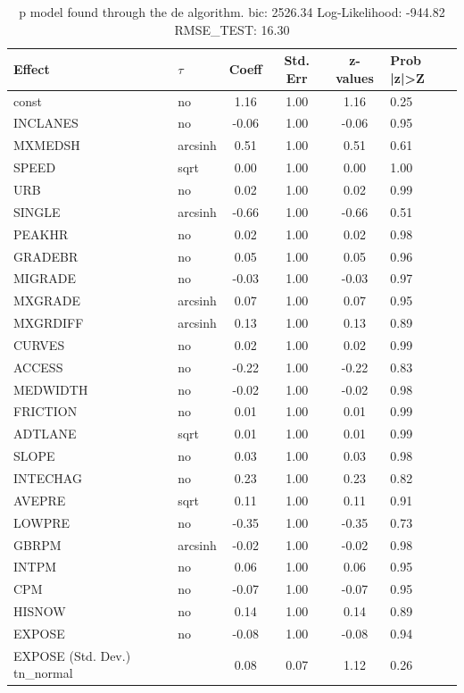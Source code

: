 \begin{table}
	\caption{p model found through the de algorithm. bic: 2526.34 Log-Likelihood: -944.82 RMSE_TEST: 16.30}
	\begin{center}
		\begin{tabular}{|l|l|c|c|c|l|}
			\hline
			Effect & $\tau$ & Coeff & Std. Err & z-values & Prob |z|>Z \\
			\hline
			const & no & 1.16 & 1.00 & 1.16 & 0.25 \\
			\hline
			INCLANES & no & -0.06 & 1.00 & -0.06 & 0.95 \\
			\hline
			MXMEDSH & arcsinh & 0.51 & 1.00 & 0.51 & 0.61 \\
			\hline
			SPEED & sqrt & 0.00 & 1.00 & 0.00 & 1.00 \\
			\hline
			URB & no & 0.02 & 1.00 & 0.02 & 0.99 \\
			\hline
			SINGLE & arcsinh & -0.66 & 1.00 & -0.66 & 0.51 \\
			\hline
			PEAKHR & no & 0.02 & 1.00 & 0.02 & 0.98 \\
			\hline
			GRADEBR & no & 0.05 & 1.00 & 0.05 & 0.96 \\
			\hline
			MIGRADE & no & -0.03 & 1.00 & -0.03 & 0.97 \\
			\hline
			MXGRADE & arcsinh & 0.07 & 1.00 & 0.07 & 0.95 \\
			\hline
			MXGRDIFF & arcsinh & 0.13 & 1.00 & 0.13 & 0.89 \\
			\hline
			CURVES & no & 0.02 & 1.00 & 0.02 & 0.99 \\
			\hline
			ACCESS & no & -0.22 & 1.00 & -0.22 & 0.83 \\
			\hline
			MEDWIDTH & no & -0.02 & 1.00 & -0.02 & 0.98 \\
			\hline
			FRICTION & no & 0.01 & 1.00 & 0.01 & 0.99 \\
			\hline
			ADTLANE & sqrt & 0.01 & 1.00 & 0.01 & 0.99 \\
			\hline
			SLOPE & no & 0.03 & 1.00 & 0.03 & 0.98 \\
			\hline
			INTECHAG & no & 0.23 & 1.00 & 0.23 & 0.82 \\
			\hline
			AVEPRE & sqrt & 0.11 & 1.00 & 0.11 & 0.91 \\
			\hline
			LOWPRE & no & -0.35 & 1.00 & -0.35 & 0.73 \\
			\hline
			GBRPM & arcsinh & -0.02 & 1.00 & -0.02 & 0.98 \\
			\hline
			INTPM & no & 0.06 & 1.00 & 0.06 & 0.95 \\
			\hline
			CPM & no & -0.07 & 1.00 & -0.07 & 0.95 \\
			\hline
			HISNOW & no & 0.14 & 1.00 & 0.14 & 0.89 \\
			\hline
			EXPOSE & no & -0.08 & 1.00 & -0.08 & 0.94 \\
			\hline
			EXPOSE (Std. Dev.) tn_normal &  & 0.08 & 0.07 & 1.12 & 0.26 \\
			\hline
		\end{tabular}
	\end{center}
\end{table}